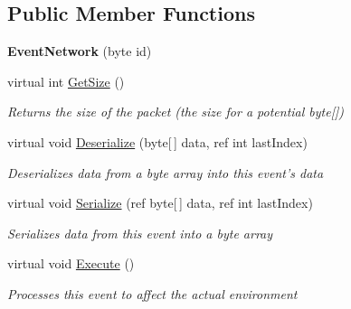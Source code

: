 \subsection*{Public Member Functions}
\begin{DoxyCompactItemize}
\item 
\hypertarget{class_event_network_a1f1a80ff09325571c5a27a45fb056d66}{{\bfseries Event\-Network} (byte id)}\label{class_event_network_a1f1a80ff09325571c5a27a45fb056d66}

\item 
virtual int \hyperlink{class_event_network_a627a22414c184cd4fbe4f23a25877166}{Get\-Size} ()
\begin{DoxyCompactList}\small\item\em Returns the size of the packet (the size for a potential byte\mbox{[}\mbox{]}) \end{DoxyCompactList}\item 
virtual void \hyperlink{class_event_network_af31b288f5029d8542122abe985f7df18}{Deserialize} (byte\mbox{[}$\,$\mbox{]} data, ref int last\-Index)
\begin{DoxyCompactList}\small\item\em Deserializes data from a byte array into this event's data \end{DoxyCompactList}\item 
virtual void \hyperlink{class_event_network_ae2574cdc2bb836f3e41628ff1c095238}{Serialize} (ref byte\mbox{[}$\,$\mbox{]} data, ref int last\-Index)
\begin{DoxyCompactList}\small\item\em Serializes data from this event into a byte array \end{DoxyCompactList}\item 
virtual void \hyperlink{class_event_network_aa5e94745568f3049a2b798c066087114}{Execute} ()
\begin{DoxyCompactList}\small\item\em Processes this event to affect the actual environment \end{DoxyCompactList}\end{DoxyCompactItemize}

